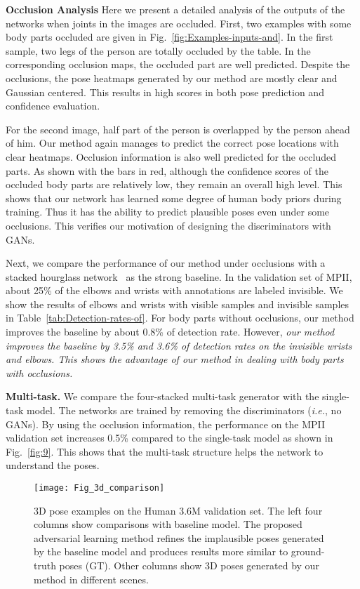 \documentclass[10pt,journal,compsoc]{IEEEtran}
\begin{document}
\noindent\textbf{Occlusion Analysis}
Here we present  a detailed analysis of the outputs of the networks when joints in the images are occluded.
First, two examples with some body parts occluded are given in Fig.~\ref{fig:Examples-inputs-and}. In the first sample, two legs of the person are totally occluded by the table. In the corresponding occlusion maps, the occluded part are well predicted.
Despite  the occlusions, the pose heatmaps generated
by our method are mostly clear and Gaussian centered. This results in high scores in both pose prediction and confidence evaluation.
%

For the second image, half part of the person is overlapped by the person ahead of him. Our method again manages to predict the correct pose locations with clear heatmaps. Occlusion information is also well predicted for the occluded parts. As shown with the bars in red, although the confidence scores of the occluded body parts are relatively
low, they remain an overall high level. This shows that our network has learned  some degree of human body priors  during training. Thus it has the ability to predict plausible  poses even under some occlusions. This verifies our motivation of designing the discriminators with GANs.

Next, we compare the performance of our method under occlusions with a stacked hourglass network~\cite{conf/eccv/NewellYD16} as the strong baseline. In the validation set of MPII, about 25\% of the elbows and wrists with annotations are labeled invisible. We show the results of elbows and wrists with visible samples and invisible samples in Table~\ref{tab:Detection-rates-of}. For body parts without occlusions, our method improves the baseline by about 0.8\% of detection rate. However, {\it our method improves the baseline by 3.5\% and 3.6\% of detection rates on the invisible wrists and elbows. This shows the advantage of our method in dealing with body parts with occlusions.}






\noindent\textbf{Multi-task.} We compare the four-stacked multi-task generator with the single-task model. The networks are trained by removing the discriminators (\emph{i.e.}, no GANs). By using the occlusion information, the performance on the MPII validation set increases 0.5\% compared to the single-task model as shown in Fig.~\ref{fig:9}. This shows that the multi-task structure helps the network to understand the poses.


\begin{figure*}[t!]
\centering
\texttt{[image: Fig\_3d\_comparison]}
%
\caption{3D pose examples on the Human 3.6M validation set. The left four columns show comparisons with baseline model. The proposed adversarial learning method refines the implausible poses generated by the baseline model and produces results more similar to ground-truth poses (GT). Other columns show 3D poses generated by our method in different scenes.}
\label{fig:Fig_3d_comparison}
\end{figure*}
\end{document}
